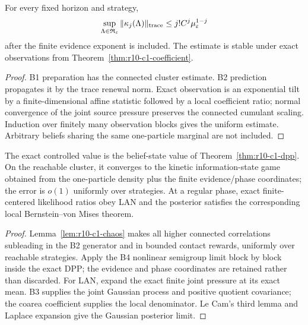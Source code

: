 \begin{lemma}
\label{lem:r10-c1-chaos}
For every fixed horizon and strategy,
\[
 \sup_{\Lambda\in\mathfrak R_\varepsilon}
 \|\kappa_j(\Lambda)\|_{\rm trace}
 \le j!C^j\mu_\varepsilon^{1-j}
\]
after the finite evidence exponent is included.  The estimate is stable under
exact observations from Theorem~\ref{thm:r10-c1-coefficient}.
\end{lemma}

\begin{proof}
B1 preparation has the connected cluster estimate.  B2 prediction propagates
it by the trace renewal norm.  Exact observation is an exponential tilt by a
finite-dimensional affine statistic followed by a local coefficient ratio;
normal convergence of the joint source pressure preserves the connected
cumulant scaling.  Induction over finitely many observation blocks gives the
uniform estimate.  Arbitrary beliefs sharing the same one-particle marginal
are not included.
\end{proof}

\begin{theorem}
\label{thm:r10-c1-main}
The exact controlled value is the belief-state value of
Theorem~\ref{thm:r10-c1-dpp}.  On the reachable cluster, it converges to the
kinetic information-state game obtained from the one-particle density plus the
finite evidence/phase coordinates; the error is \(o(1)\) uniformly over
strategies.  At a regular phase, exact finite-centered likelihood ratios obey
LAN and the posterior satisfies the corresponding local Bernstein--von Mises
theorem.
\end{theorem}

\begin{proof}
Lemma~\ref{lem:r10-c1-chaos} makes all higher connected correlations
subleading in the B2 generator and in bounded contact rewards, uniformly over
reachable strategies.  Apply the B4 nonlinear semigroup limit block by block
inside the exact DPP; the evidence and phase coordinates are retained rather
than discarded.  For LAN, expand the exact finite joint pressure at its exact
mean.  B3 supplies the joint Gaussian process and positive quotient
covariance; the coarea coefficient supplies the local denominator.  Le Cam's
third lemma and Laplace expansion give the Gaussian posterior limit.
\end{proof}
